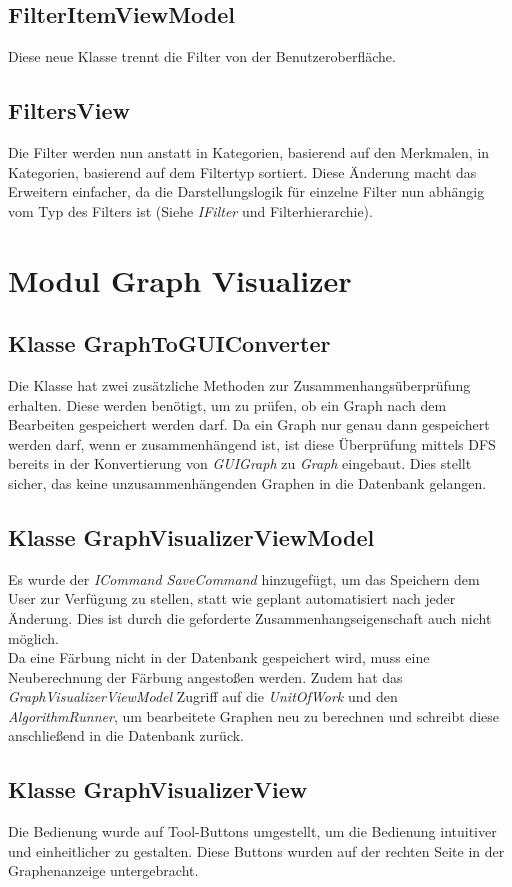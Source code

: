 \documentclass[13pt]{scrreprt}
\begin{document}
	\subsection{FilterItemViewModel}
	Diese neue Klasse trennt die Filter von der Benutzeroberfläche.
	
	\subsection{FiltersView}
	Die Filter werden nun anstatt in Kategorien, basierend auf den Merkmalen, in Kategorien, basierend auf dem Filtertyp sortiert.
	Diese Änderung macht das Erweitern einfacher, da die Darstellungslogik für einzelne Filter nun abhängig vom Typ des Filters ist (Siehe \textit{IFilter} und Filterhierarchie).

\section{Modul Graph Visualizer}
	\subsection{Klasse GraphToGUIConverter}
	Die Klasse hat zwei zusätzliche Methoden zur Zusammenhangsüberprüfung erhalten.
	Diese werden benötigt, um zu prüfen, ob ein Graph nach dem Bearbeiten gespeichert werden darf.
	Da ein Graph nur genau dann gespeichert werden darf, wenn er zusammenhängend ist, ist diese Überprüfung mittels DFS bereits in der Konvertierung von \textit{GUIGraph} zu \textit{Graph} eingebaut.
	Dies stellt sicher, das keine unzusammenhängenden Graphen in die Datenbank gelangen.
	
	\subsection{Klasse GraphVisualizerViewModel}
	Es wurde der \textit{ICommand SaveCommand} hinzugefügt, um das Speichern dem User zur Verfügung zu stellen, statt wie geplant automatisiert nach jeder Änderung.
	Dies ist durch die geforderte Zusammenhangseigenschaft auch nicht möglich.\\
	Da eine Färbung nicht in der Datenbank gespeichert wird, muss eine Neuberechnung der Färbung angestoßen werden.
	Zudem hat das \textit{GraphVisualizerViewModel} Zugriff auf die \textit{UnitOfWork} und den \textit{AlgorithmRunner}, um bearbeitete Graphen neu zu berechnen und schreibt diese anschließend in die Datenbank zurück.
	
	\subsection{Klasse GraphVisualizerView}
	Die Bedienung wurde auf Tool-Buttons umgestellt, um die Bedienung intuitiver und einheitlicher zu gestalten. Diese Buttons wurden auf der rechten Seite in der Graphenanzeige untergebracht.
	
\end{document}
